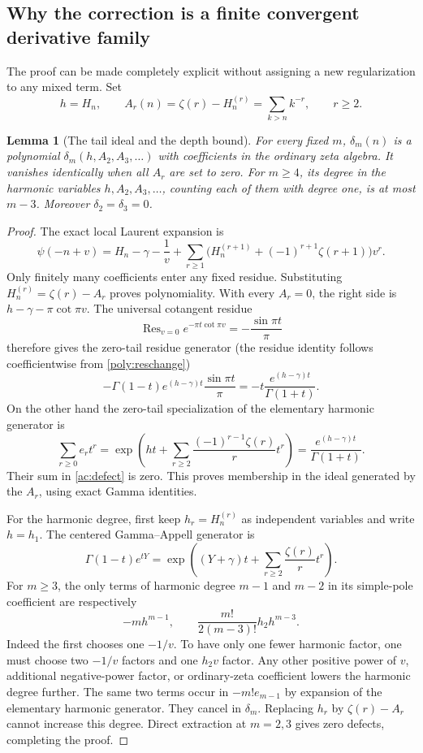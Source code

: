 \documentclass[11pt,a4paper]{article}
\numberwithin{equation}{section}
\newtheorem{lemma}[theorem]{Lemma}
\theoremstyle{definition}
\theoremstyle{remark}
\DeclareMathOperator*{\Res}{Res}
\begin{document}
\subsection{Why the correction is a finite convergent derivative family}

The proof can be made completely explicit without assigning a new
regularization to any mixed term. Set
\begin{equation}\label{ac:tails}
 h=H_n,\qquad A_r(n)=\zeta(r)-H_n^{(r)}=\sum_{k>n}k^{-r},
                     \qquad r\ge2.
\end{equation}

\begin{lemma}[The tail ideal and the depth bound]
\label{ac:tailideal}
For every fixed $m$, $\delta_m(n)$ is a polynomial
$\delta_m(h,A_2,A_3,\ldots)$ with coefficients in the ordinary
zeta algebra. It vanishes identically when all $A_r$ are set to
zero. For $m\ge4$, its degree in the harmonic variables
$h,A_2,A_3,\ldots$, counting each of them with degree one, is at
most $m-3$. Moreover $\delta_2=\delta_3=0$.
\end{lemma}

\begin{proof}
The exact local Laurent expansion is
\begin{equation}\label{ac:local}
 \psi(-n+v)=H_n-\gamma-\frac1v
       +\sum_{r\ge1}\bigl(H_n^{(r+1)}+(-1)^{r+1}\zeta(r+1)\bigr)v^r.
\end{equation}
Only finitely many coefficients enter any fixed residue. Substituting
$H_n^{(r)}=\zeta(r)-A_r$ proves polynomiality.
With every $A_r=0$, the right side is
$h-\gamma-\pi\cot\pi v$. The universal cotangent residue
\[
 \Res_{v=0}e^{-\pi t\cot\pi v}=-\frac{\sin\pi t}{\pi}
\]
therefore gives the zero-tail residue generator (the residue identity follows coefficientwise from \eqref{poly:reschange})
\[
 -\Gamma(1-t)e^{(h-\gamma)t}\frac{\sin\pi t}{\pi}
 =-t\frac{e^{(h-\gamma)t}}{\Gamma(1+t)}.
\]
On the other hand the zero-tail specialization of the elementary
harmonic generator is
\[
 \sum_{r\ge0}e_r t^r
 =\exp\left(ht+\sum_{r\ge2}\frac{(-1)^{r-1}\zeta(r)}r t^r\right)
 =\frac{e^{(h-\gamma)t}}{\Gamma(1+t)}.
\]
Their sum in \eqref{ac:defect} is zero. This proves membership in
the ideal generated by the $A_r$, using exact Gamma identities.

For the harmonic degree, first keep $h_r=H_n^{(r)}$ as independent
variables and write $h=h_1$. The centered Gamma--Appell generator is
\[
 \Gamma(1-t)e^{tY}
 =\exp\left((Y+\gamma)t+\sum_{r\ge2}\frac{\zeta(r)}r t^r\right).
\]
For $m\ge3$, the only terms of harmonic degree $m-1$ and $m-2$
in its simple-pole coefficient are respectively
\[
 -m h^{m-1},\qquad
 \frac{m!}{2(m-3)!}h_2h^{m-3}.
\]
Indeed the first chooses one $-1/v$. To have only one fewer
harmonic factor, one must choose two $-1/v$ factors and one
$h_2v$ factor. Any other positive power of $v$, additional
negative-power factor, or ordinary-zeta coefficient lowers the
harmonic degree further. The same two terms occur in
$-m!e_{m-1}$ by expansion of the elementary harmonic generator.
They cancel in $\delta_m$. Replacing $h_r$ by $\zeta(r)-A_r$
cannot increase this degree. Direct extraction at $m=2,3$ gives
zero defects, completing the proof.
\end{proof}
\end{document}
